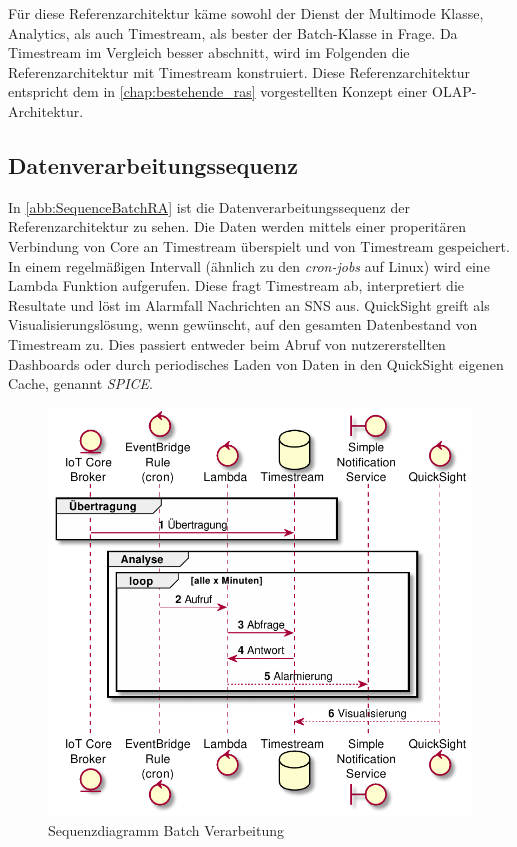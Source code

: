 Für diese Referenzarchitektur käme sowohl der Dienst der Multimode Klasse, \AWSIOT{} Analytics, als auch Timestream, als bester der Batch-Klasse in Frage. Da Timestream im Vergleich besser abschnitt, wird im Folgenden die Referenzarchitektur mit Timestream konstruiert.
Diese Referenzarchitektur entspricht dem in \autoref{chap:bestehende_ras} vorgestellten Konzept einer \ac{OLAP}-Architektur.

\subsection{Datenverarbeitungssequenz}
In \autoref{abb:SequenceBatchRA} ist die Datenverarbeitungssequenz der Referenzarchitektur zu sehen. Die Daten werden mittels einer properitären Verbindung von \AWSIOT{} Core an Timestream überspielt und von Timestream gespeichert. In einem regelmäßigen Intervall (ähnlich zu den \textit{cron-jobs} auf Linux) wird eine Lambda Funktion aufgerufen. Diese fragt Timestream ab, interpretiert die Resultate und löst im Alarmfall Nachrichten an \ac{SNS} aus. QuickSight greift als Visualisierungslösung, wenn gewünscht, auf den gesamten Datenbestand von Timestream zu. Dies passiert entweder beim Abruf von nutzererstellten Dashboards oder durch periodisches Laden von Daten in den QuickSight eigenen Cache, genannt \textit{SPICE}.
\begin{figure}[H]
\centering
\includegraphics[width=\textwidth]{graphics/batch-ra.pdf}
\caption{Sequenzdiagramm Batch Verarbeitung}
\label{abb:SequenceBatchRA}
\end{figure}



